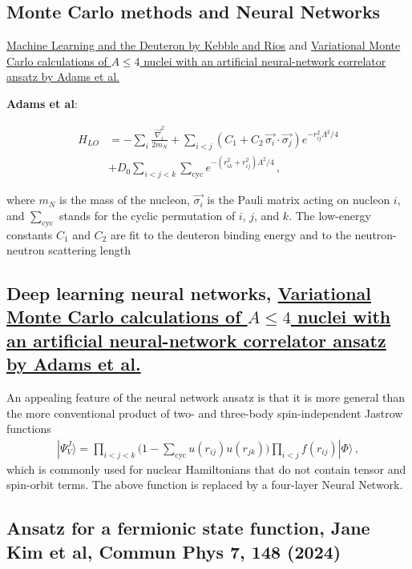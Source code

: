 \documentclass[%
oneside,                 %
final,                   %
10pt]{article}
\begin{document}
\subsection{Monte Carlo methods and Neural Networks}

\href{{https://www.sciencedirect.com/science/article/pii/S0370269320305463?via%3Dihub}}{Machine Learning and the Deuteron by Kebble and Rios} and
\href{{https://journals.aps.org/prl/abstract/10.1103/PhysRevLett.127.022502}}{Variational Monte Carlo calculations of $A\le 4$ nuclei with an artificial neural-network correlator ansatz by Adams et al.}

\textbf{Adams et al}:

\begin{align}
H_{LO} &=-\sum_i \frac{{\vec{\nabla}_i^2}}{2m_N}
+\sum_{i<j} {\left(C_1  + C_2\, \vec{\sigma_i}\cdot\vec{\sigma_j}\right)
e^{-r_{ij}^2\Lambda^2 / 4 }}
\nonumber\\
&+D_0 \sum_{i<j<k} \sum_{\text{cyc}}
{e^{-\left(r_{ik}^2+r_{ij}^2\right)\Lambda^2/4}}\,,
\end{align}

where $m_N$ is the mass of the nucleon, $\vec{\sigma_i}$ is the Pauli
matrix acting on nucleon $i$, and $\sum_{\text{cyc}}$ stands for the
cyclic permutation of $i$, $j$, and $k$. The low-energy constants
$C_1$ and $C_2$ are fit to the deuteron binding energy and to the
neutron-neutron scattering length

\subsection{Deep learning neural networks, \href{{https://journals.aps.org/prl/abstract/10.1103/PhysRevLett.127.022502}}{Variational Monte Carlo calculations of $A\le 4$ nuclei with an artificial neural-network correlator ansatz by Adams et al.}}

An appealing feature of the neural network ansatz is that it is more general than the more conventional product of two-
and three-body spin-independent Jastrow functions
\begin{align}
|\Psi_V^J \rangle = \prod_{i<j<k} \Big( 1-\sum_{\text{cyc}} u(r_{ij}) u(r_{jk})\Big) \prod_{i<j} f(r_{ij}) | \Phi\rangle\,,
\end{align}
which is commonly used for nuclear Hamiltonians that do not contain tensor and spin-orbit terms.
The above function is replaced by a four-layer Neural Network. 

\subsection{Ansatz for a fermionic state function, Jane Kim et al, Commun Phys 7, 148 (2024)}
\end{document}
